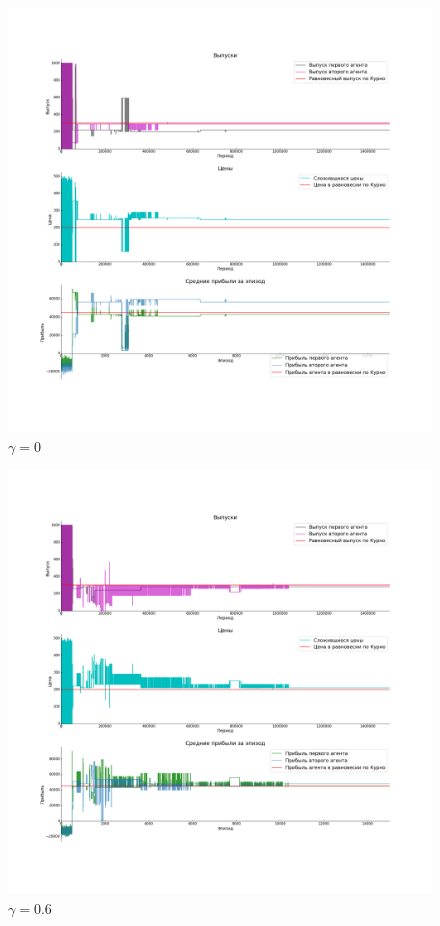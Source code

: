 \documentclass[12pt, a4paper]{extarticle}
\theoremstyle{definition}
\begin{document}
\begin{figure}[h]
    \centering
    \includegraphics[width=\textwidth,height=\textheight,keepaspectratio]{no_gamma.png}
    \caption{$\gamma = 0$}
    \label{fig:gamma0}
\end{figure}

\begin{figure}[h]
    \centering
    \includegraphics[width=\textwidth,height=\textheight,keepaspectratio]{gamma_6.png}
    \caption{$\gamma = 0.6$}
    \label{fig:gamma6}
\end{figure}
\end{document}
